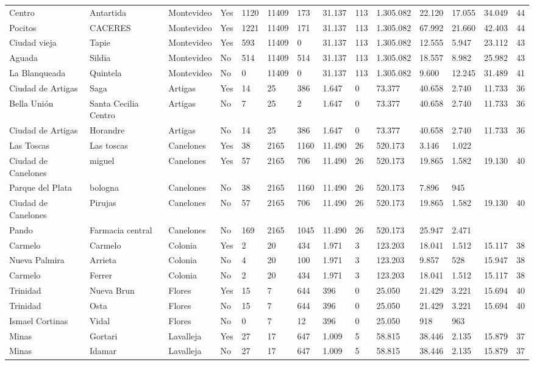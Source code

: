 \documentclass[11pt]{article}
\begin{document}
\begin{landscape}
\begin{longtable}[htbp]{@{}p{1.2cm}p{1cm}p{1.5cm}p{1cm}p{1cm}p{1cm}p{1cm}p{1cm}p{1cm}p{1cm}p{1cm}p{1.2cm}p{1cm}p{1cm}@{}}
Centro	&	Antartida	&	Montevideo	&	Yes	&	1120	&	11409	&	173	&	31.137	&	113	&	1.305.082	&	22.120	&	17.055	&	34.049	&	44	\tabularnewline
Pocitos	&	CACERES	&	Montevideo	&	Yes	&	1221	&	11409	&	171	&	31.137	&	113	&	1.305.082	&	67.992	&	21.660	&	42.403	&	44	\tabularnewline
Ciudad vieja	&	Tapie	&	Montevideo	&	Yes	&	593	&	11409	&	0	&	31.137	&	113	&	1.305.082	&	12.555	&	5.947	&	23.112	&	43	\tabularnewline
Aguada	&	Sildia	&	Montevideo	&	No	&	514	&	11409	&	514	&	31.137	&	113	&	1.305.082	&	18.557	&	8.982	&	25.982	&	43	\tabularnewline
La Blanqueada	&	Quintela	&	Montevideo	&	No	&	0	&	11409	&	0	&	31.137	&	113	&	1.305.082	&	9.600	&	12.245	&	31.489	&	41	\tabularnewline
Ciudad de Artigas	&	Saga	&	Artigas	&	Yes	&	14	&	25	&	386	&	1.647	&	0	&	73.377	&	40.658	&	2.740	&	11.733	&	36	\tabularnewline
Bella Unión	&	Santa Cecilia Centro	&	Artigas	&	No	&	7	&	25	&	2	&	1.647	&	0	&	73.377	&	40.658	&	2.740	&	11.733	&	36	\tabularnewline
Ciudad de Artigas	&	Horandre	&	Artigas	&	No	&	14	&	25	&	386	&	1.647	&	0	&	73.377	&	40.658	&	2.740	&	11.733	&	36	\tabularnewline
Las Toscas	&	Las toscas	&	Canelones	&	Yes	&	38	&	2165	&	1160	&	11.490	&	26	&	520.173	&	3.146	&	1.022	&		&		\tabularnewline
Ciudad de Canelones	&	miguel	&	Canelones	&	Yes	&	57	&	2165	&	706	&	11.490	&	26	&	520.173	&	19.865	&	1.582	&	19.130	&	40	\tabularnewline
Parque del Plata	&	bologna	&	Canelones	&	No	&	38	&	2165	&	1160	&	11.490	&	26	&	520.173	&	7.896	&	945	&		&		\tabularnewline
Ciudad de Canelones	&	Pirujas	&	Canelones	&	No	&	57	&	2165	&	706	&	11.490	&	26	&	520.173	&	19.865	&	1.582	&	19.130	&	40	\tabularnewline
Pando	&	Farmacia central	&	Canelones	&	No	&	169	&	2165	&	1045	&	11.490	&	26	&	520.173	&	25.947	&	2.471	&		&		\tabularnewline
Carmelo	&	Carmelo	&	Colonia	&	Yes	&	2	&	20	&	434	&	1.971	&	3	&	123.203	&	18.041	&	1.512	&	15.117	&	38	\tabularnewline
Nueva Palmira	&	Arrieta	&	Colonia	&	No	&	4	&	20	&	100	&	1.971	&	3	&	123.203	&	9.857	&	528	&	15.947	&	38	\tabularnewline
Carmelo	&	Ferrer	&	Colonia	&	No	&	2	&	20	&	434	&	1.971	&	3	&	123.203	&	18.041	&	1.512	&	15.117	&	38	\tabularnewline
Trinidad	&	Nueva Brun	&	Flores	&	Yes	&	15	&	7	&	644	&	396	&	0	&	25.050	&	21.429	&	3.221	&	15.694	&	40	\tabularnewline
Trinidad	&	Osta	&	Flores	&	No	&	15	&	7	&	644	&	396	&	0	&	25.050	&	21.429	&	3.221	&	15.694	&	40	\tabularnewline
Ismael Cortinas	&	Vidal	&	Flores	&	No	&	0	&	7	&	12	&	396	&	0	&	25.050	&	918	&	963	&		&		\tabularnewline
Minas	&	Gortari	&	Lavalleja	&	Yes	&	27	&	17	&	647	&	1.009	&	5	&	58.815	&	38.446	&	2.135	&	15.879	&	37	\tabularnewline
Minas	&	Idamar	&	Lavalleja	&	No	&	27	&	17	&	647	&	1.009	&	5	&	58.815	&	38.446	&	2.135	&	15.879	&	37	\tabularnewline

\end{longtable}
\end{landscape}
\end{document}
